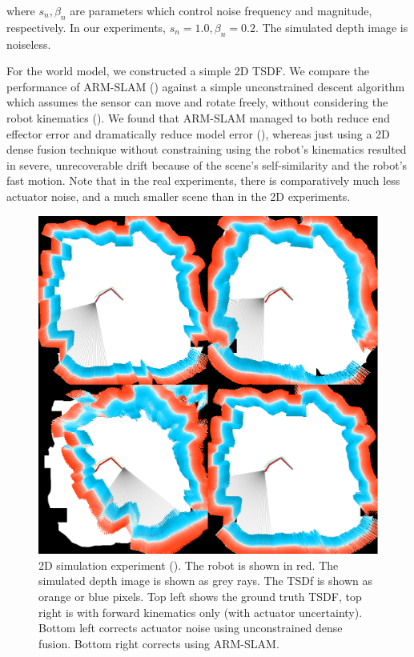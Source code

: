 \noindent where $s_n, \beta_n$ are parameters which control noise frequency and magnitude, respectively. In our experiments, $s_n=1.0, \beta_n=0.2$. The simulated depth image is noiseless.

For the world model, we constructed a  simple 2D {TSDF}. We compare the performance of ARM-SLAM () against a simple unconstrained descent algorithm which assumes the sensor can move and rotate freely, without considering the robot kinematics (). We found that ARM-SLAM managed to both reduce end effector error and dramatically reduce model error (), whereas just using a 2D dense fusion technique without constraining using the robot's kinematics resulted in severe, unrecoverable drift because of the scene's self-similarity and the robot's fast motion. Note that in the real experiments, there is comparatively much less actuator noise, and a much smaller scene than in the 2D experiments.

\begin{figure}[ht]
\centering
\includegraphics[width=0.78\columnwidth]{img/arm_slam/2d_experiments/2d_end.png}
\caption{2D simulation experiment (). The robot is shown in red. The simulated depth image is shown as grey rays. The TSDf is shown as orange or blue pixels. Top left shows the ground truth {TSDF}, top right is with forward kinematics only (with actuator uncertainty). Bottom left corrects actuator noise using unconstrained dense fusion. Bottom right corrects using ARM-SLAM.}
\label{fig:2d_experiment}
\end{figure}

